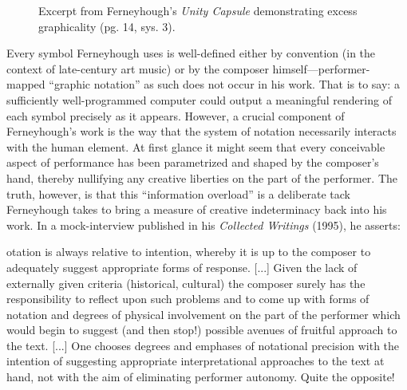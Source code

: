             \begin{figure} 
                \centering
                \captionsetup{width=.5\textwidth}
                \caption[Excerpt from Ferneyhough's \textit{Unity Capsule} demonstrating excess graphicality (pg. 14, sys. 3).]{Excerpt from Ferneyhough's \textit{Unity Capsule} demonstrating excess graphicality (pg. 14, sys. 3).\footnotemark}
                \label{fig:unitycapsule}
            \end{figure}
                
        Every symbol Ferneyhough uses is well-defined either by convention (in the context of late-century art music) or by the composer himself---performer-mapped ``graphic notation'' as such does not occur in his work. That is to say: a sufficiently well-programmed computer could output a meaningful rendering of each symbol precisely as it appears. However, a crucial component of Ferneyhough's work is the way that the system of notation necessarily interacts with the human element. At first glance it might seem that every conceivable aspect of performance has been parametrized and shaped by the composer's hand, thereby nullifying any creative liberties on the part of the performer. The truth, however, is that this ``information overload'' is a deliberate tack Ferneyhough takes to bring a measure of creative indeterminacy back into his work. In a mock-interview published in his \textit{Collected Writings} (1995), he asserts:

        \begin{smallquote}
            [N]otation is always relative to intention, whereby it is up to the composer to adequately suggest appropriate forms of response. [...] Given the lack of externally given criteria (historical, cultural) the composer surely has the responsibility to reflect upon such problems and to come up with forms of notation and degrees of physical involvement on the part of the performer which would begin to suggest (and then stop!) possible avenues of fruitful approach to the text. [...] One chooses degrees and emphases of notational precision with the intention of suggesting appropriate interpretational approaches to the text at hand, not with the aim of eliminating performer autonomy. Quite the opposite!\autocite[70--1]{Ferneyhough_1995}
        \end{smallquote}
        
